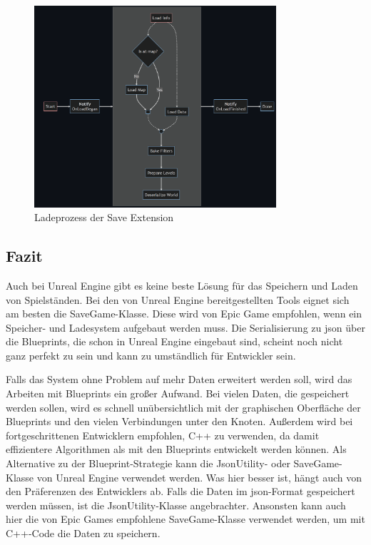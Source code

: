 \begin{figure}[htp]
    \centering
    \includegraphics[width=0.8\textwidth]{images/piperift_load_process.png}
    \caption{Ladeprozess der Save Extension\cite{piperiftLoadProcess}}
    \label{fig:piperiftLoadProcess}
\end{figure}



\subsection{Fazit}
Auch bei Unreal Engine gibt es keine beste Lösung für das Speichern und Laden von Spielständen. Bei den von Unreal Engine bereitgestellten Tools eignet sich am besten die SaveGame-Klasse. Diese wird von Epic Game empfohlen, wenn ein Speicher- und Ladesystem aufgebaut werden muss. Die Serialisierung zu \ac{json} über die Blueprints, die schon in Unreal Engine eingebaut sind, scheint noch nicht ganz perfekt zu sein und kann zu umständlich für Entwickler sein. 

Falls das System ohne Problem auf mehr Daten erweitert werden soll, wird das Arbeiten mit Blueprints ein großer Aufwand. Bei vielen Daten, die gespeichert werden sollen, wird es schnell unübersichtlich mit der graphischen Oberfläche der Blueprints und den vielen Verbindungen unter den Knoten. Außerdem wird bei fortgeschrittenen Entwicklern empfohlen, C++ zu verwenden, da damit effizientere Algorithmen als mit den Blueprints entwickelt werden können.\cite{epicgamesComparingBlueprints} Als Alternative zu der Blueprint-Strategie kann die JsonUtility- oder SaveGame-Klasse von Unreal Engine verwendet werden. Was hier besser ist, hängt auch von den Präferenzen des Entwicklers ab. Falls die Daten im \ac{json}-Format gespeichert werden müssen, ist die JsonUtility-Klasse angebrachter. Ansonsten kann auch hier die von Epic Games empfohlene SaveGame-Klasse verwendet werden, um mit C++-Code die Daten zu speichern.

